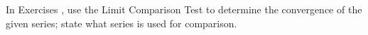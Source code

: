 {\noindent In Exercises}
{, use the Limit Comparison Test to determine the convergence of the given series; state what series is used for comparison.
}
